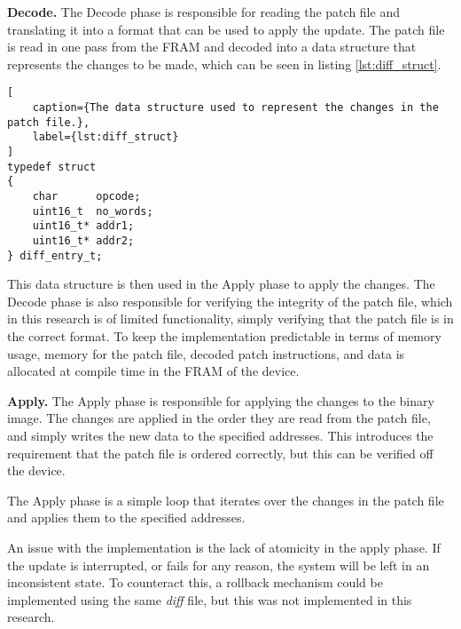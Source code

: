 \textbf{Decode.}
The Decode phase is responsible for reading the patch file and translating it into a format that can be used to apply the update. The patch file is read in one pass from the FRAM and decoded into a data structure that represents the changes to be made, which can be seen in listing \ref{lst:diff_struct}. 
\begin{lstlisting}[
    caption={The data structure used to represent the changes in the patch file.},
    label={lst:diff_struct}
]
typedef struct  
{
    char      opcode;
    uint16_t  no_words;
    uint16_t* addr1;
    uint16_t* addr2;
} diff_entry_t;
\end{lstlisting}
This data structure is then used in the Apply phase to apply the changes. The Decode phase is also responsible for verifying the integrity of the patch file, which in this research is of limited functionality, simply verifying that the patch file is in the correct format. To keep the implementation predictable in terms of memory usage, memory for the patch file, decoded patch instructions, and data is allocated at compile time in the FRAM of the device.

\textbf{Apply.}
The Apply phase is responsible for applying the changes to the binary image. The changes are applied in the order they are read from the patch file, and simply writes the new data to the specified addresses. This introduces the requirement that the patch file is ordered correctly, but this can be verified off the device. 

The Apply phase is a simple loop that iterates over the changes in the patch file and applies them to the specified addresses. 

An issue with the implementation is the lack of atomicity in the apply phase. If the update is interrupted, or fails for any reason, the system will be left in an inconsistent state. To counteract this, a rollback mechanism could be implemented using the same \textit{diff} file, but this was not implemented in this research. 
